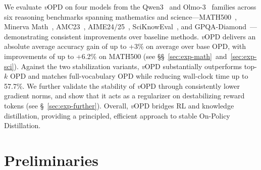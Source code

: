 \documentclass{article}
\newcommand{\method}{\emph{v}OPD}
\begin{document}
We evaluate \method{} on four models from the Qwen3~\citep{yang2025qwen3} and Olmo-3~\citep{olmo2025olmo} families across six reasoning benchmarks spanning mathematics and science---MATH500~\citep{hendrycks2021math,lightman2024let}, Minerva Math~\citep{lewkowycz2022solving}, AMC23~\citep{maa_amc}, AIME24/25~\citep{maa_aime}, SciKnowEval~\citep{feng2024sciknoweval}, and GPQA-Diamond~\citep{rein2024gpqa}---demonstrating consistent improvements over baseline methods. \method{} delivers an absolute average accuracy gain of up to +3\%  on average over base OPD, with improvements of up to +6.2\% on MATH500 (see \S\S~\ref{sec:exp-math}~and~\ref{sec:exp-sci}). Against the two stabilization variants, \method{} substantially outperforms top-$k$ OPD and matches full-vocabulary OPD while reducing wall-clock time up to 57.7\%. We further validate the stability of \method{} through consistently lower gradient norms, and show that it acts as a regularizer on destabilizing reward tokens (see \S~\ref{sec:exp-further}). Overall, \method{} bridges RL and knowledge distillation, providing a principled, efficient approach to stable On-Policy Distillation.

\section{Preliminaries}
\label{sec:prelim}
\end{document}
